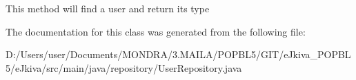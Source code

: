 This method will find a user and return its type 

The documentation for this class was generated from the following file\+:\begin{DoxyCompactItemize}
\item 
D\+:/\+Users/user/\+Documents/\+M\+O\+N\+D\+R\+A/3.\+M\+A\+I\+L\+A/\+P\+O\+P\+B\+L5/\+G\+I\+T/e\+Jkiva\+\_\+\+P\+O\+P\+B\+L5/e\+Jkiva/src/main/java/repository/User\+Repository.\+java\end{DoxyCompactItemize}
